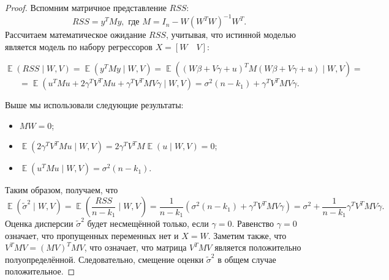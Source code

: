 \documentclass[12pt]{article}
\DeclareMathOperator{\Var}{\mathbb{V}ar}
\DeclareMathOperator{\E}{\mathbb{E}}
\newcommand{\hb}{\hat{\beta}}
\newcommand{\tb}{\tilde{\beta}}
\newcommand{\RSS}{RSS}
\begin{document}
\begin{proof}
Вспомним матричное представление $\RSS$:
\[
\RSS = y^{T}My, \text{ где } M = I_n - W(W^{T}W)^{-1}W^{T}.
\]
Рассчитаем математическое ожидание $\RSS$, учитывая, что истинной моделью является модель по набору регрессоров $X = [W \quad V]$:

\[
\E(\RSS \mid W,V) = \E(y^{T}My \mid W,V) = \E((W\beta + V\gamma + u)^{T}M(W\beta + V\gamma + u) \mid W,V) = 
\]
\[
=\E(u^{T}Mu + 2\gamma^{T}V^{T}Mu + \gamma^{T}V^{T}MV\gamma \mid W,V) = \sigma^2(n-k_1) + \gamma^{T}V^{T}MV\gamma.
\]

Выше мы использовали следующие результаты:
\begin{itemize}
    \item $MW = 0$;
    \item $\E(2\gamma^{T}V^{T}Mu \mid W,V) = 2\gamma^{T}V^{T}M\E(u \mid W,V) = 0$;
    \item  $\E (u^{T}Mu \mid W,V) = \sigma^2(n-k_1)$.
\end{itemize}

Таким образом, получаем, что 
\[
\E(\tilde\sigma^2 \mid W,V) = \E\left( \frac{RSS}{n-k_1}  \mid W,V\right) = \frac{1}{n-k_1} ( \sigma^2(n-k_1) + \gamma^{T}V^{T}MV\gamma ) = \sigma^2 + \frac{1}{n - k_1} \gamma^{T}V^{T}MV\gamma.
\]
Оценка дисперсии $\tilde\sigma^2$ будет несмещённой только, если $\gamma = 0$. 
Равенство $\gamma = 0$ означает, что пропущенных переменных нет и $X = W$.
Заметим также, что $V^{T}MV = (MV)^{T}MV$, что означает, что матрица $V^{T}MV$ является положительно полуопределённой. 
Следовательно, смещение оценки $\tilde\sigma^2$ в общем случае положительное.
\end{proof}

\end{document}
